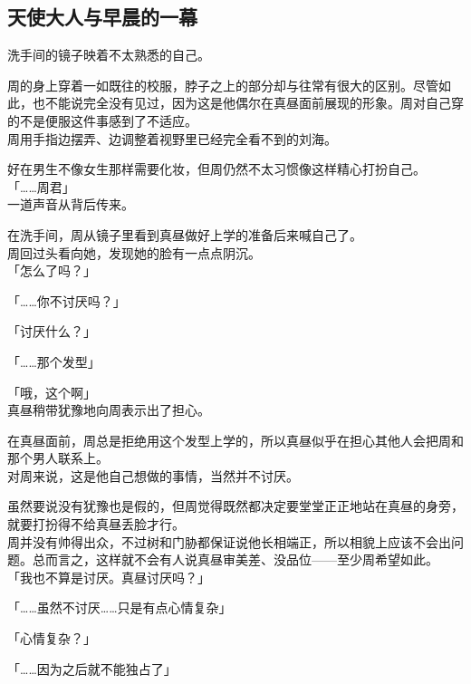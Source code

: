 \subsection{天使大人与早晨的一幕}

洗手间的镜子映着不太熟悉的自己。

周的身上穿着一如既往的校服，脖子之上的部分却与往常有很大的区别。尽管如此，也不能说完全没有见过，因为这是他偶尔在真昼面前展现的形象。周对自己穿的不是便服这件事感到了不适应。\\

周用手指边摆弄、边调整着视野里已经完全看不到的刘海。

好在男生不像女生那样需要化妆，但周仍然不太习惯像这样精心打扮自己。\\

「……周君」\\

一道声音从背后传来。

在洗手间，周从镜子里看到真昼做好上学的准备后来喊自己了。\\

周回过头看向她，发现她的脸有一点点阴沉。\\

「怎么了吗？」

「……你不讨厌吗？」

「讨厌什么？」

「……那个发型」

「哦，这个啊」\\

真昼稍带犹豫地向周表示出了担心。

在真昼面前，周总是拒绝用这个发型上学的，所以真昼似乎在担心其他人会把周和那个男人联系上。\\

对周来说，这是他自己想做的事情，当然并不讨厌。

虽然要说没有犹豫也是假的，但周觉得既然都决定要堂堂正正地站在真昼的身旁，就要打扮得不给真昼丢脸才行。\\

周并没有帅得出众，不过树和门胁都保证说他长相端正，所以相貌上应该不会出问题。总而言之，这样就不会有人说真昼审美差、没品位——至少周希望如此。\\

「我也不算是讨厌。真昼讨厌吗？」

「……虽然不讨厌……只是有点心情复杂」

「心情复杂？」

「……因为之后就不能独占了」\\

